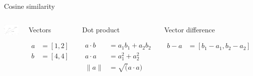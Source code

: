 \documentclass[
  10pt,
  ignorenonframetext,
  x11names, dvipsnames, bibspacing, natbib, table]{beamer}
\begin{document}
\begin{frame}{Cosine similarity}
\protect\hypertarget{cosine-similarity-1}{}
\begin{columns}
    

\begin{center}\includegraphics[width=1\linewidth]{tryOut_files/figure-beamer/cosine2-1} \end{center}



\footnotesize 


\begin{block}{Vectors}

\begin{align*}
a  & = [1,2]\\
b  &= [4,4]
\end{align*}

\end{block}


\begin{block}{Dot product}

\begin{align*}
a \cdot b & = a_1 b_1 + a_2 b_2\\
a \cdot a & = a_1^2 + a_2 ^ 2 \\
\lVert a\rVert & = \sqrt(a \cdot a)
\end{align*}

\end{block}


\begin{block}{Vector difference}

\begin{align*}
b - a & = [b_1- a_1, b_2 - a_2 ]
\end{align*}

\end{block}

\end{columns}
\end{frame}
\end{document}
